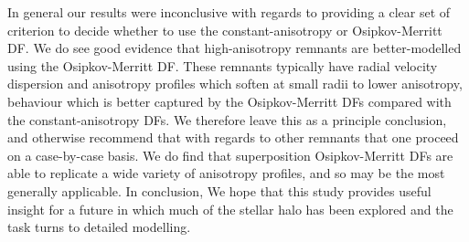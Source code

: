 In general our results were inconclusive with regards to providing a clear set of criterion to decide whether to use the constant-anisotropy or Osipkov-Merritt DF. We do see good evidence that high-anisotropy remnants are better-modelled using the Osipkov-Merritt DF. These remnants typically have radial velocity dispersion and anisotropy profiles which soften at small radii to lower anisotropy, behaviour which is better captured by the Osipkov-Merritt DFs compared with the constant-anisotropy DFs. We therefore leave this as a principle conclusion, and otherwise recommend that with regards to other remnants that one proceed on a case-by-case basis. We do find that superposition Osipkov-Merritt DFs are able to replicate a wide variety of anisotropy profiles, and so may be the most generally applicable. In conclusion, We hope that this study provides useful insight for a future in which much of the stellar halo has been explored and the task turns to detailed modelling.








% 









% 

